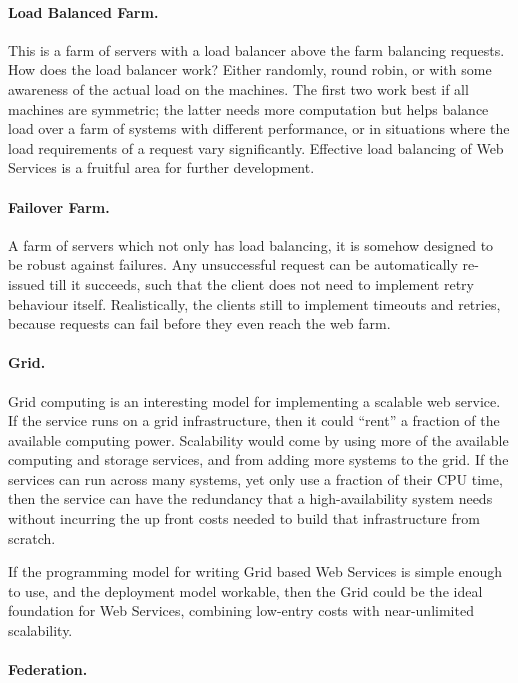 \documentclass[draft]{report}
\begin{document}
\paragraph{Load Balanced Farm.}

This is a farm of servers with a load balancer above the farm balancing
requests. How does the load balancer work? Either randomly, round robin,
or with some awareness of the actual load on the machines. The first two
work best if all machines are symmetric; the latter needs more
computation but helps balance load over a farm of systems with different
performance, or in situations where the load requirements of a request
vary significantly. Effective load balancing of Web Services is a
fruitful area for further development.

\paragraph{Failover Farm.}

A farm of servers which not only has load balancing, it is somehow
designed to be robust against failures. Any unsuccessful request can be
automatically re-issued till it succeeds, such that the client does not
need to implement retry behaviour itself. Realistically, the clients
still to implement timeouts and retries, because requests can fail
before they even reach the web farm.

\paragraph{Grid.}

Grid computing is an interesting model for implementing a scalable web
service. If the service runs on a grid infrastructure, then it could
``rent'' a fraction of the available computing power. Scalability would
come by using more of the available computing and storage services, and
from adding more systems to the grid. If the services can run across
many systems, yet only use a fraction of their CPU time, then the
service can have the redundancy that a high-availability system needs
without incurring the up front costs needed to build that infrastructure
from scratch.

If the programming model for writing Grid based Web Services is simple
enough to use, and the deployment model workable, then the Grid could be
the ideal foundation for Web Services, combining low-entry costs with
near-unlimited scalability.

\paragraph{Federation.}
\end{document}
